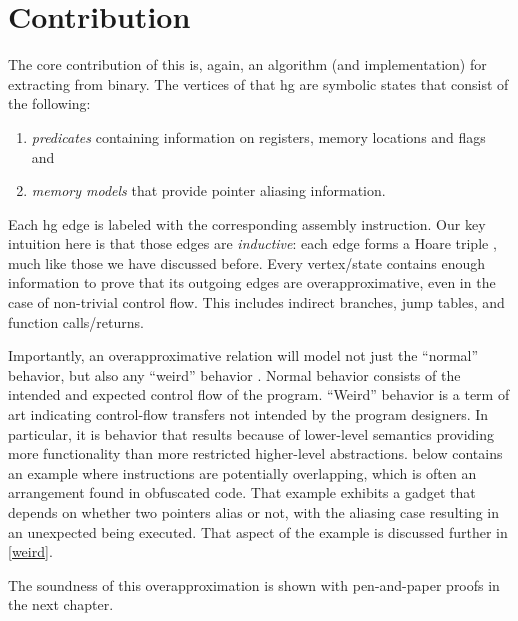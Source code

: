 \section{Contribution}
The core contribution of this  is, again, an algorithm (and implementation) for extracting  from  binary.
The vertices of that \ac{hg} are symbolic states that consist of the following:
\begin{enumerate}
  \item \emph{predicates} containing information on registers, memory locations and flags and
  \item \emph{memory models} that provide pointer aliasing information.
\end{enumerate}
Each \ac{hg} edge is labeled with the corresponding assembly instruction.
Our key intuition here is that those edges are  \emph{inductive}:
each edge forms a Hoare triple \autocite{hoare1969axiomatic},
much like those we have discussed before.
Every vertex/state contains enough information to prove that its outgoing edges are overapproximative,
even in the case of non-trivial control flow.
This includes indirect branches, jump tables, and function calls/returns.

Importantly, an overapproximative relation will model not just the ``normal'' behavior, but also any ``weird'' behavior \autocite{shapiro2013weird,dullien2017weird}.
Normal behavior consists of the intended and expected control flow of the program.
``Weird'' behavior is a term of art indicating control-flow transfers not intended by the program designers.
In particular, it is behavior that results because of lower-level semantics providing more functionality than more restricted higher-level abstractions.
 below contains an example where instructions are potentially overlapping, which is often an arrangement found in obfuscated code.
That example exhibits a  gadget that depends on whether two pointers alias or not, with the aliasing case resulting in an unexpected  being executed. That aspect of the example is discussed further in \cref{weird}.

The soundness of this overapproximation is shown with pen-and-paper proofs in the next chapter.

